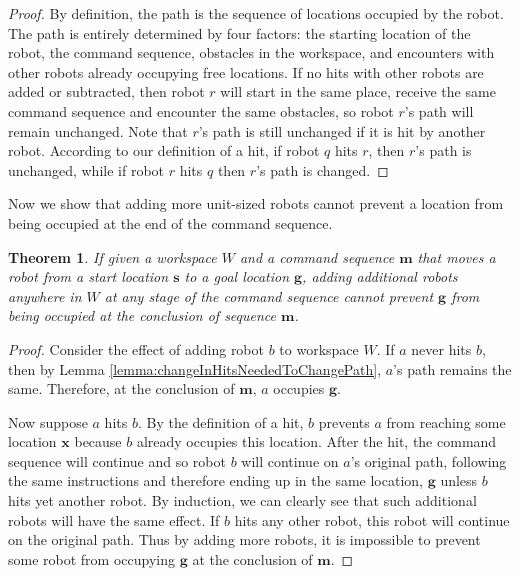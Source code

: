 \documentclass[letterpaper, 10 pt, conference]{ieeeconf}
\newtheorem{theorem}{Theorem}
\begin{document}
\begin{proof}
By definition, the path is the sequence of locations occupied by the robot. The path is entirely determined by four factors: the starting location of the robot, the command sequence, obstacles in the workspace,  and encounters with other robots already occupying free locations. If no hits with other robots are added or subtracted, then robot $r$ will start in the same place, receive the same command sequence and encounter the same obstacles, so robot $r$'s path will remain unchanged.  Note that $r$'s path is still unchanged if it is hit by another robot. According to our definition of a hit, if robot $q$ hits $r$, then $r$'s path is unchanged, while if robot $r$ hits $q$ then $r$'s path is changed. 
\end{proof}

Now we show that adding more unit-sized robots cannot prevent a location from being occupied at the end of the command sequence.

\begin{theorem}\label{thm:AdditionalRobotsCannotPreventAnOccupation}
If given a workspace $W$ and a command sequence $\bm{m}$ that moves a robot from a start location $\bm{s}$ to a goal location $\bm{g}$, adding additional robots anywhere in $W$ at any stage of the command sequence cannot prevent $\bm{g}$ from being occupied at the conclusion of sequence $\bm{m}$.
\end{theorem}

\begin{proof} Consider the effect of adding robot $b$ to workspace $W$. If $a$ never hits $b$, then by Lemma \ref{lemma:changeInHitsNeededToChangePath}, $a$'s path remains the same. Therefore, at the conclusion of $\bm{m}$, $a$ occupies $\bm{g}$. 

Now suppose $a$ hits $b$. By the definition of a hit, $b$ prevents $a$ from reaching some location $\bm{x}$ because $b$ already occupies this location. After the hit, the command sequence will continue and so robot $b$ will continue on $a$'s original path, following the same instructions and therefore ending up in the same location, $\bm{g}$ unless $b$ hits yet another robot. By induction, we can clearly see that such additional robots will have the same effect. If $b$ hits any other robot, this robot will continue on the original path. Thus by adding more robots, it is impossible to prevent some robot from occupying $\bm{g}$ at the conclusion of $\bm{m}$.  
\end{proof}
\end{document}
